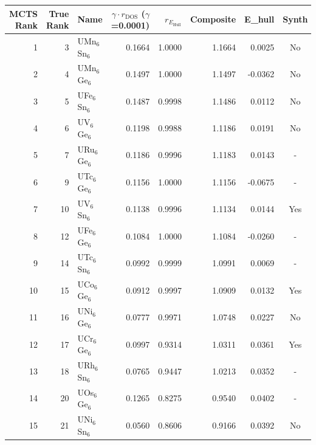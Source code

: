 \begin{tabular}{rrlrrrrc}
\toprule
MCTS Rank & True Rank & Name & $\gamma \cdot r_{\mathrm{DOS}}$ ($\gamma$=0.0001) & $r_{E_{\mathrm{Hull}}}$ & Composite & E\_hull & Synth \\
\midrule
1 & 3 & UMn$_{6}$Sn$_{6}$ & 0.1664 & 1.0000 & 1.1664 & 0.0025 & No \\
2 & 4 & UMn$_{6}$Ge$_{6}$ & 0.1497 & 1.0000 & 1.1497 & -0.0362 & No \\
3 & 5 & UFe$_{6}$Sn$_{6}$ & 0.1487 & 0.9998 & 1.1486 & 0.0112 & No \\
4 & 6 & UV$_{6}$Ge$_{6}$ & 0.1198 & 0.9988 & 1.1186 & 0.0191 & No \\
5 & 7 & URu$_{6}$Ge$_{6}$ & 0.1186 & 0.9996 & 1.1183 & 0.0143 & - \\
6 & 9 & UTc$_{6}$Ge$_{6}$ & 0.1156 & 1.0000 & 1.1156 & -0.0675 & - \\
7 & 10 & UV$_{6}$Sn$_{6}$ & 0.1138 & 0.9996 & 1.1134 & 0.0144 & Yes \\
8 & 12 & UFe$_{6}$Ge$_{6}$ & 0.1084 & 1.0000 & 1.1084 & -0.0260 & - \\
9 & 14 & UTc$_{6}$Sn$_{6}$ & 0.0992 & 0.9999 & 1.0991 & 0.0069 & - \\
10 & 15 & UCo$_{6}$Ge$_{6}$ & 0.0912 & 0.9997 & 1.0909 & 0.0132 & Yes \\
11 & 16 & UNi$_{6}$Ge$_{6}$ & 0.0777 & 0.9971 & 1.0748 & 0.0227 & No \\
12 & 17 & UCr$_{6}$Ge$_{6}$ & 0.0997 & 0.9314 & 1.0311 & 0.0361 & Yes \\
13 & 18 & URh$_{6}$Sn$_{6}$ & 0.0765 & 0.9447 & 1.0213 & 0.0352 & - \\
14 & 20 & UOs$_{6}$Ge$_{6}$ & 0.1265 & 0.8275 & 0.9540 & 0.0402 & - \\
15 & 21 & UNi$_{6}$Sn$_{6}$ & 0.0560 & 0.8606 & 0.9166 & 0.0392 & No \\
\bottomrule
\end{tabular}
